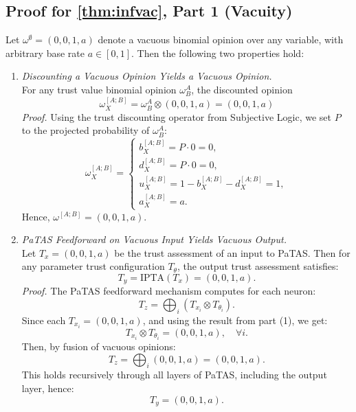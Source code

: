 \subsection{Proof for \cref{thm:infvac}, Part 1 (Vacuity)}

Let \( \omega^\emptyset = (0, 0, 1, a) \) denote a vacuous binomial opinion over any variable, with arbitrary base rate \( a \in [0, 1] \). Then the following two properties hold:

\begin{enumerate}
    \item \emph{Discounting a Vacuous Opinion Yields a Vacuous Opinion.} \\
    For any trust value binomial opinion \(\omega^A_B \), the discounted opinion
    \[
    \omega^{[A;B]}_X = \omega^A_B \otimes (0,0,1,a)= (0,0,1,a)
    \]
    \textit{Proof.} Using the trust discounting operator from Subjective Logic, we set $P$ to the projected probability of \(\omega^A_B\):
    \[\omega^{[A;B]}_X = 
    \begin{cases}
    b^{[A;B]}_X = P\cdot 0 = 0, \\
    d^{[A;B]}_X = P\cdot 0 = 0, \\
    u^{[A;B]}_X = 1 - b^{[A;B]}_X-d^{[A;B]}_X = 1, \\
    a^{[A;B]}_X = a.
    \end{cases}
    \]
    Hence, \( \omega^{[A;B]} = (0,0,1,a) \).

    \item \emph{PaTAS Feedforward on Vacuous Input Yields Vacuous Output.} \\
    Let \( T_x = (0,0,1,a)\) be the trust assessment of an input to PaTAS. Then for any parameter trust configuration \( T_\theta \), the output trust assessment satisfies:
    \[
    T_y = \text{IPTA}(T_x) = (0,0,1,a).
    \]
    \textit{Proof.} The PaTAS feedforward mechanism computes for each neuron:
    \[
    T_z = \bigoplus_i \left( T_{x_i} \otimes T_{\theta_i} \right).
    \]
    Since each \( T_{x_i} = (0,0,1,a) \), and using the result from part (1), we get:
    \[
    T_{x_i} \otimes T_{\theta_i} = (0,0,1,a), \quad \forall i.
    \]
    Then, by fusion of vacuous opinions:
    \[
    T_z = \bigoplus_i (0,0,1,a) = (0,0,1,a).
    \]
    This holds recursively through all layers of PaTAS, including the output layer, hence:
    \[
    T_y = (0,0,1,a).
    \]
\end{enumerate}

